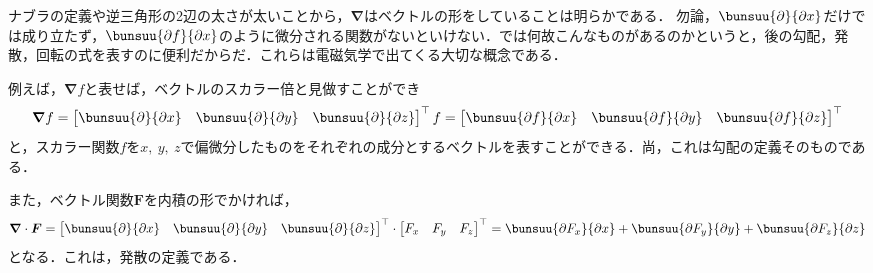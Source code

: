 ナブラの定義や逆三角形の2辺の太さが太いことから，$\bm{\nabla}$はベクトルの形をしていることは明らかである．
勿論，$\bunsuu{\partial}{\partial x}$だけでは成り立たず，$\bunsuu{\partial f}{\partial x}$のように微分される関数がないといけない．では何故こんなものがあるのかというと，後の勾配，発散，回転の式を表すのに便利だからだ．これらは電磁気学で出てくる大切な概念である．

例えば，$\bm{\nabla} f$と表せば，ベクトルのスカラー倍と見做すことができ
\begin{equation*}
	\bm{\nabla} f =
	\begin{bmatrix}
		\bunsuu{\partial}{\partial x} &
		\bunsuu{\partial}{\partial y} &
		\bunsuu{\partial}{\partial z}
	\end{bmatrix}^\top
	f
	=
	\begin{bmatrix}
		\bunsuu{\partial f}{\partial x} &
		\bunsuu{\partial f}{\partial y} &
		\bunsuu{\partial f}{\partial z}
	\end{bmatrix}^\top
\end{equation*}
と，スカラー関数$f$を$x,\ y,\ z$で偏微分したものをそれぞれの成分とするベクトルを表すことができる．尚，これは勾配の定義そのものである．

また，ベクトル関数$\bm{F}$を内積の形でかければ，
\begin{equation*}
	\bm{\nabla} \cdot \bm{F} =
	\begin{bmatrix}
		\bunsuu{\partial}{\partial x} &
		\bunsuu{\partial}{\partial y} &
		\bunsuu{\partial}{\partial z}
	\end{bmatrix}^\top
	\cdot
	\begin{bmatrix}
		F_x & F_y & F_z
	\end{bmatrix}^\top
	= \bunsuu{\partial F_x}{\partial x} + \bunsuu{\partial F_y}{\partial y} + \bunsuu{\partial F_z}{\partial z}
\end{equation*}
となる．これは，発散の定義である．

